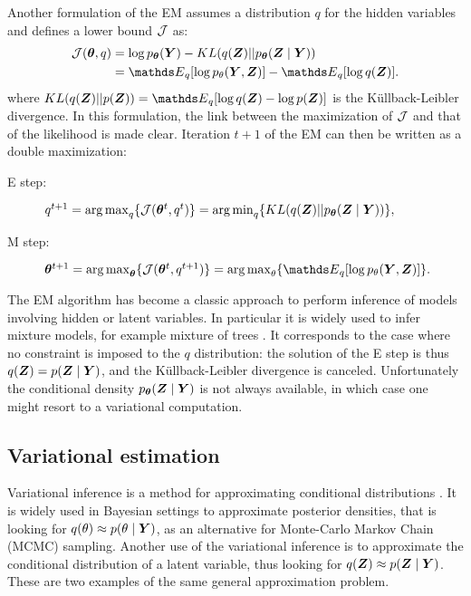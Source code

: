  Another formulation of the EM assumes a distribution $q$ for the hidden variables \citep{NH98} and defines a  lower bound ${\mathcal{J}}$ as:
\begin{align*}
\bound(\thetabf, q) &= \log p_\thetab (\Ybf) - KL(q(\Zbf) || p_\thetab(\Zbf\mid\Ybf))\\
&=\Esp_q [\log p_\theta (\Ybf,\Zbf)] - \Esp_q[\log q(\Zbf)].
\end{align*}
 where $KL(q(\Zbf)||p(\Zbf)) = \Esp_q[\log q(\Zbf) - \log p(\Zbf)]$ is the Küllback-Leibler divergence. In this formulation, the link between the maximization of ${\mathcal{J}}$ and that of the likelihood is made clear. Iteration $t+1$ of the EM can then be written as a double maximization:
  \begin{description}
 \item [E step:]  $q^{t+1}=\operatorname*{arg\,max}_q \{ {\mathcal{J}}({\boldsymbol{\theta}}^t, q^t)\} = \operatorname*{arg\,min}_q \{ KL(q({\boldsymbol{Z}}) || p_{\boldsymbol{\theta}}({\boldsymbol{Z}}\mid{\boldsymbol{Y}}))\},$
 \item [M step:] $\thetab^{t+1} = \argmax_\thetab \{ \bound(\thetabf^t, q^{t+1})\} = \argmax_\theta \{ \Esp_q [\log p_\theta (\Ybf,\Zbf)]\}.$
 \end{description} 

The EM algorithm has become a classic approach to perform inference of models involving hidden or latent variables. In particular it is widely used to infer mixture models, for example mixture of trees \cite{MixtTrees}. It corresponds to the case where no constraint is imposed to the $q$ distribution: the solution of the E step is thus $q({\boldsymbol{Z}})=p({\boldsymbol{Z}}\mid{\boldsymbol{Y}})$, and the Küllback-Leibler divergence is canceled.  Unfortunately the conditional density $p_{\boldsymbol{\theta}}({\boldsymbol{Z}}\mid{\boldsymbol{Y}})$ is not always available, in which case one might resort to a variational computation.
 

 \subsection{Variational estimation}
 Variational inference is a method for approximating conditional distributions \citep{JGZ99,WaJ08,BKM17}. It is widely used in Bayesian settings to approximate posterior densities, that is looking for $q(\theta)\approx p(\theta\mid {\boldsymbol{Y}})$, as an alternative for Monte-Carlo Markov Chain (MCMC) sampling. Another use of the variational inference is to approximate the conditional distribution of a latent variable, thus looking for $q({\boldsymbol{Z}}) \approx p({\boldsymbol{Z}}\mid {\boldsymbol{Y}})$. These are two examples of the same general approximation problem.
 
